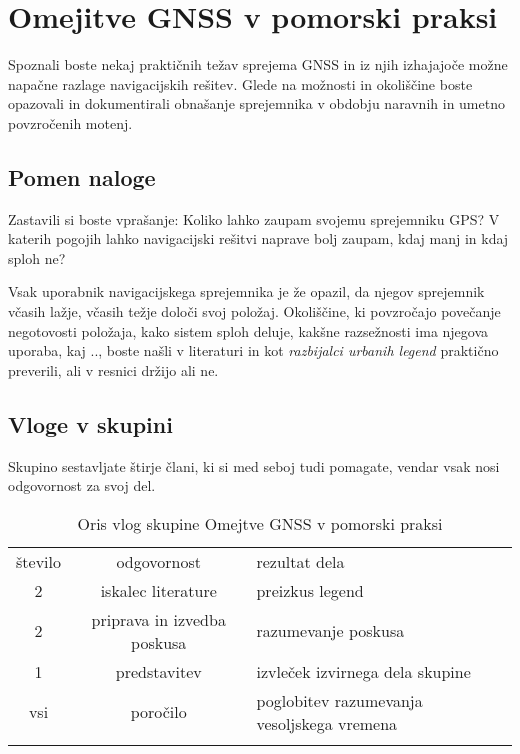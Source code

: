 %
\chapter{Omejitve GNSS v pomorski praksi}
\label{Vaje:GnssPraks} %

Spoznali boste nekaj praktičnih težav sprejema GNSS in iz njih izhajajoče možne napačne razlage navigacijskih rešitev. Glede na možnosti in okoliščine boste opazovali in dokumentirali obnašanje sprejemnika v obdobju naravnih in umetno povzročenih motenj.

\section{Pomen naloge}
\label{sec:GnnsPomen}

Zastavili si boste vprašanje: Koliko lahko zaupam svojemu sprejemniku GPS? V katerih pogojih lahko navigacijski rešitvi naprave bolj zaupam, kdaj manj in kdaj sploh ne?

Vsak uporabnik navigacijskega sprejemnika je že opazil, da njegov sprejemnik včasih lažje, včasih težje določi svoj položaj. Okoliščine, ki povzročajo povečanje negotovosti položaja, kako sistem sploh deluje, kakšne razsežnosti ima njegova uporaba, kaj .., boste našli v literaturi in kot \textit{razbijalci urbanih legend} praktično preverili, ali v resnici držijo ali ne.  

\section{Vloge v skupini}
\label{sec:Gnss_Vloge}
Skupino sestavljate štirje člani, ki si med seboj tudi pomagate, vendar vsak nosi odgovornost za svoj del.

\begin{table}
	\centering
	\caption{Oris vlog skupine Omejtve GNSS v pomorski praksi}
	\label{tab:GnssVloge} 
	\begin{tabular}{c|c|l}
		\hline\noalign{\bigskip}
		število & odgovornost                 & rezultat dela \\
		\noalign{\smallskip}\hline\noalign{\smallskip}
		2       & iskalec literature          & preizkus legend\\
		2       & priprava in izvedba poskusa & razumevanje poskusa \\
		1       & predstavitev                & izvleček izvirnega dela skupine \\ \hline
		vsi     & poročilo                    & poglobitev razumevanja vesoljskega vremena\\
		\noalign{\smallskip}\hline
	\end{tabular}
\end{table}

